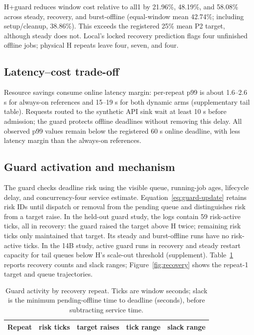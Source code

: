 H+guard reduces window cost relative to all1 by 21.96\%, 48.19\%, and 58.08\%
across steady, recovery, and burst-offline (equal-window mean 42.74\%; including
setup/cleanup, 38.86\%). This exceeds the registered 25\% mean P2 target,
although steady does not. Local's locked recovery prediction flags four unfinished
offline jobs; physical H repeats leave four, seven, and four.

\subsection{Latency--cost trade-off}
Resource savings consume online latency margin: per-repeat p99 is about
1.6--2.6 s for always-on references and 15--19 s for both dynamic arms
(supplementary tail table). Requests routed to the synthetic API sink wait
at least 10 s before admission; the guard protects offline deadlines without
removing this delay. All observed p99 values remain below the registered
60 s online deadline, with less latency margin than the always-on references.

\subsection{Guard activation and mechanism}
The guard checks deadline risk using the visible queue, running-job ages,
lifecycle delay, and concurrency-four service estimate. Equation~\ref{eq:guard-update} retains risk IDs until dispatch
or removal from the pending queue and distinguishes risk from a target raise.
In the held-out guard study, the logs contain 59 risk-active ticks, all in recovery:
the guard raised the target above H twice; remaining risk ticks only maintained
that target. Its steady and burst-offline runs have no risk-active
ticks. In the 14B study, active guard runs in recovery and steady restart
capacity for tail queues below H's scale-out threshold (supplement).
Table~\ref{tab:guard} reports recovery counts and slack ranges;
Figure~\ref{fig:recovery} shows the repeat-1 target and queue trajectories.

\begin{table}[t]
\centering
\small
\caption{Guard activity by recovery repeat. Ticks are window seconds; slack is
the minimum pending-offline time to deadline (seconds), before subtracting
service time.}
\label{tab:guard}
\par\vspace{4pt}
\begin{tabular*}{\linewidth}{@{\extracolsep{\fill}}lrrrr@{}}
\toprule
Repeat & risk ticks & target raises & tick range & slack range\\
\midrule

\end{tabular*}
\end{table}




